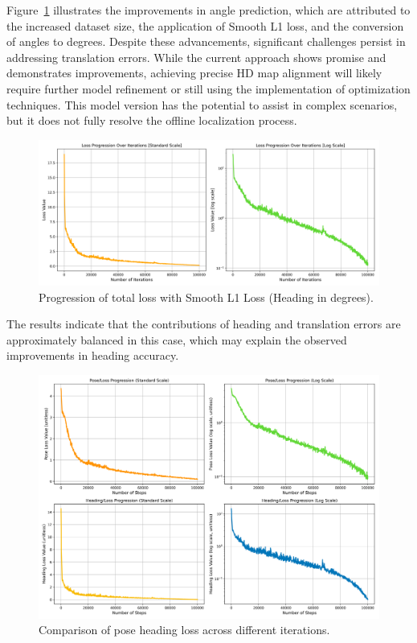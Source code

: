 Figure~\ref{fig:total-loss-progression} illustrates the improvements in angle prediction, which are attributed to the increased dataset size, the application of Smooth L1 loss, and the conversion of angles to degrees. Despite these advancements, significant challenges persist in addressing translation errors. While the current approach shows promise and demonstrates improvements, achieving precise HD map alignment will likely require further model refinement or still using the implementation of optimization techniques. This model version has the potential to assist in complex scenarios, but it does not fully resolve the offline localization process.
\begin{figure}[H]
    \centering
    \includegraphics[width=1\linewidth]{loss_total_l1sDEG_progression_comparison.png}
    \caption{Progression of total loss with Smooth L1 Loss (Heading in degrees).}
    \label{fig:total-loss-progression}
\end{figure}

The results indicate that the contributions of heading and translation errors are approximately balanced in this case, which may explain the observed improvements in heading accuracy.
\begin{figure}[H]
    \centering
    \includegraphics[width=1\linewidth]{LateX//figs/l1sDEG_pose_heading_loss_comparison.png}
    \caption{Comparison of pose heading loss across different iterations.}
    \label{fig:pose-heading-loss-2}
\end{figure}

